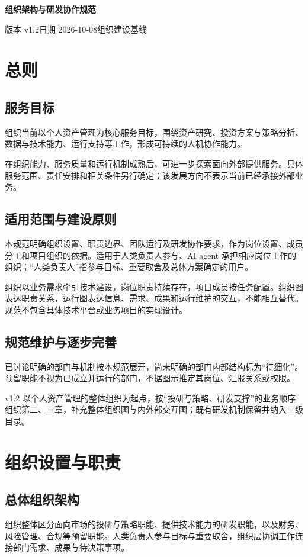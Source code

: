 \documentclass[11pt,a4paper]{article}
\begin{document}
\begin{center}
{\LARGE\sffamily\bfseries 组织架构与研发协作规范}\par
\vspace{5pt}
{\small 版本 v1.2\quad 日期 2026-10-08\quad 组织建设基线}
\end{center}
\begingroup
\small\setlength{\parskip}{0pt}\linespread{1.02}\selectfont
\tableofcontents
\endgroup
\newpage
\section{总则}
\subsection{服务目标}
组织当前以个人资产管理为核心服务目标，围绕资产研究、投资方案与策略分析、数据与技术能力、运行支持等工作，形成可持续的人机协作能力。

在组织能力、服务质量和运行机制成熟后，可进一步探索面向外部提供服务。具体服务范围、责任安排和相关条件另行确定；该发展方向不表示当前已经承接外部业务。

\subsection{适用范围与建设原则}
本规范明确组织设置、职责边界、团队运行及研发协作要求，作为岗位设置、成员分工和项目组织的依据。适用于人类负责人参与、AI agent 承担相应岗位工作的组织；“人类负责人”指参与目标、重要取舍及总体方案确定的用户。

组织以业务需求牵引技术建设，岗位职责持续存在，项目成员按任务配置。组织图表达职责关系，运行图表达信息、需求、成果和运行维护的交互，不能相互替代。规范不包含具体技术平台或业务项目的实现设计。

\subsection{规范维护与逐步完善}
已讨论明确的部门与机制按本规范展开，尚未明确的部门内部结构标为“待细化”。预留职能不视为已成立并运行的部门，不据图示推定其岗位、汇报关系或权限。

v1.2 以个人资产管理的整体组织为起点，按“投研与策略、研发支撑”的业务顺序组织第二、三章，补充整体组织图与内外部交互图；既有研发机制保留并纳入三级目录。

\section{组织设置与职责}
\subsection{总体组织架构}
组织整体区分面向市场的投研与策略职能、提供技术能力的研发职能，以及财务、风险管理、合规等预留职能。人类负责人参与目标与重要取舍，组织层协调工作连接部门需求、成果与待决策事项。
\end{document}
